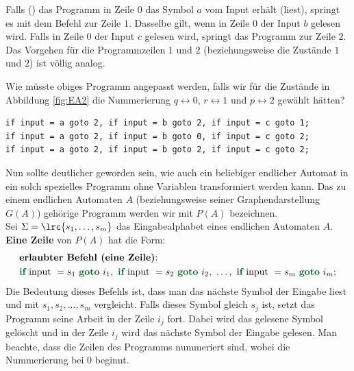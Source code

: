Falls () das Programm in Zeile $0$ das Symbol $a$ vom Input erhält (liest), springt es mit dem  Befehl zur Zeile $1$. Dasselbe gilt, wenn in Zeile $0$ der Input $b$ gelesen wird. Falls in Zeile $0$ der Input $c$ gelesen wird, springt das Programm zur Zeile $2$. Das Vorgehen für die Programmzeilen $1$ und $2$ (beziehungsweise die Zustände $1$ und $2$) ist völlig analog.
\clearpage
\begin{myexercise}\label{myexercise:equivalentProgramms}%
	\noindent
	Wie müsste obiges Programm angepasst werden, falls wir für die Zustände in Abbildung \cref{fig:EA2} die Nummerierung $q \leftrightarrow 0$, $r \leftrightarrow 1$ und $p \leftrightarrow 2$ gewählt hätten?\\
\end{myexercise}
\begin{myanswer}
	\begin{verbatim}
if input = a goto 2, if input = b goto 2, if input = c goto 1;
if input = a goto 2, if input = b goto 0, if input = c goto 2;
if input = a goto 2, if input = b goto 2, if input = c goto 2;
\end{verbatim}
\end{myanswer}
\vspace{0.5cm}
\noindent
Nun sollte deutlicher geworden sein, wie auch ein beliebiger endlicher Automat in ein solch spezielles Programm ohne Variablen transformiert werden kann. Das zu einem endlichen Automaten $A$ (beziehungsweise seiner Graphendarstellung $G(A)$) gehörige Programm werden wir mit $P(A)$ bezeichnen.\\
Sei $\Sigma = \lrc{s_1,\ldots ,s_m}$ das Eingabealphabet eines endlichen Automaten $A$. \textbf{Eine Zeile} von $P(A)$ hat die Form:
\begin{align}\label{eq:erlauberBefehl}
	 & \text{\textbf{erlaubter Befehl (eine Zeile)}:}\nonumber                                  \\
	 & \text{\textbf{\darkgreenone{if}} input }= s_1 \text{ \textbf{\darkgreenone{goto}} } i_1,
	\text{ \textbf{\darkgreenone{if}} input }= s_2 \text{ \textbf{\darkgreenone{goto}} } i_2,\text{ \ldots  },
	\text{ \textbf{\darkgreenone{if}} input }= s_m \text{ \textbf{\darkgreenone{goto}} } i_m;
\end{align}
Die Bedeutung dieses Befehls ist, dass man das nächste Symbol der Eingabe liest und mit $s_1,s_2,\ldots ,s_m$ vergleicht. Falls dieses Symbol gleich $s_j$ ist, setzt das Programm seine Arbeit in der Zeile $i_j$ fort. Dabei wird das gelesene Symbol gelöscht und in der Zeile $i_j$ wird das nächste Symbol der Eingabe gelesen. Man beachte, dass die Zeilen des Programms nummeriert sind, wobei die Nummerierung bei $0$ beginnt.\\
